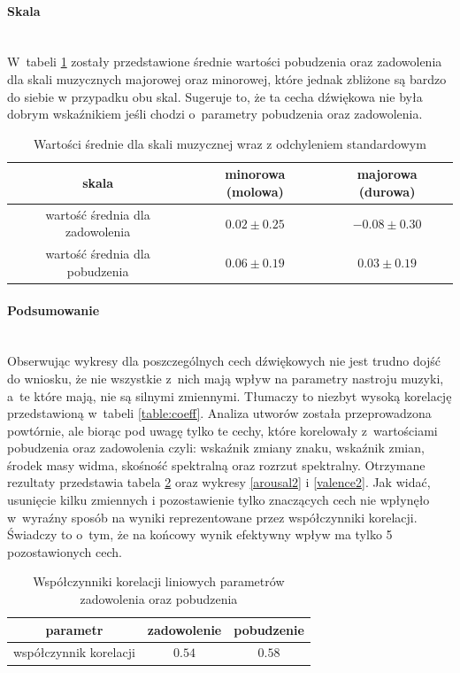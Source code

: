 \paragraph{Skala}\mbox{}\\
W~tabeli \ref{table:scale} zostały przedstawione średnie wartości pobudzenia oraz zadowolenia dla skali muzycznych majorowej oraz minorowej, które jednak zbliżone są bardzo do siebie w przypadku obu skal. Sugeruje to, że ta cecha dźwiękowa nie była dobrym wskaźnikiem jeśli chodzi o~parametry pobudzenia oraz zadowolenia. 
\begin{table}
\centering
\begin{tabular}{|c|c|c|}
\hline
 skala & minorowa (molowa) & majorowa (durowa) \\ 
\hline
 wartość średnia dla zadowolenia & $0.02 \pm 0.25$ & $-0.08 \pm 0.30$ \\  
\hline 
 wartość średnia dla pobudzenia & $0.06 \pm 0.19$ & $0.03 \pm 0.19$ \\  
\hline 
\end{tabular}
\caption{Wartości średnie dla skali muzycznej wraz z odchyleniem standardowym} \label{table:scale}
\end{table}
\paragraph{Podsumowanie}\mbox{}\\
Obserwując wykresy dla poszczególnych cech dźwiękowych nie jest trudno dojść do wniosku, że nie wszystkie z~nich mają wpływ na parametry nastroju muzyki, a~te które mają, nie są silnymi zmiennymi. Tłumaczy to niezbyt wysoką korelację przedstawioną w~tabeli \ref{table:coeff}. Analiza utworów została przeprowadzona powtórnie, ale biorąc pod uwagę tylko te cechy, które korelowały z~wartościami pobudzenia oraz zadowolenia czyli: wskaźnik zmiany znaku, wskaźnik zmian, środek masy widma, skośność spektralną oraz rozrzut spektralny. Otrzymane rezultaty przedstawia tabela \ref{table:coeff2} oraz wykresy \ref{arousal2} i \ref{valence2}. Jak widać, usunięcie kilku zmiennych i pozostawienie tylko znaczących cech nie wpłynęło w~wyraźny sposób na wyniki reprezentowane przez współczynniki korelacji. Świadczy to o~tym, że na końcowy wynik efektywny wpływ ma tylko 5 pozostawionych cech.

\begin{table}
\centering
\begin{tabular}{|c|c|c|}
\hline
 parametr & zadowolenie & pobudzenie \\ 
\hline
 współczynnik korelacji & $0.54$ & $0.58$ \\  
\hline 
\end{tabular}
\caption{Współczynniki korelacji liniowych parametrów zadowolenia oraz pobudzenia} \label{table:coeff2}
\end{table}


